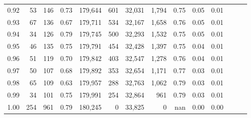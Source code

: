 \begin{tabular}{rrrrrrrrrrrrrr}
0.92 &     53 &  146 &  0.73 &  179,644 &      601 &  32,031 &   1,794 &  0.75 &  0.05 &      0.01 \\
0.93 &     67 &  136 &  0.67 &  179,711 &      534 &  32,167 &   1,658 &  0.76 &  0.05 &      0.01 \\
0.94 &     34 &  126 &  0.79 &  179,745 &      500 &  32,293 &   1,532 &  0.75 &  0.05 &      0.01 \\
0.95 &     46 &  135 &  0.75 &  179,791 &      454 &  32,428 &   1,397 &  0.75 &  0.04 &      0.01 \\
0.96 &     51 &  119 &  0.70 &  179,842 &      403 &  32,547 &   1,278 &  0.76 &  0.04 &      0.01 \\
0.97 &     50 &  107 &  0.68 &  179,892 &      353 &  32,654 &   1,171 &  0.77 &  0.03 &      0.01 \\
0.98 &     65 &  109 &  0.63 &  179,957 &      288 &  32,763 &   1,062 &  0.79 &  0.03 &      0.01 \\
0.99 &     34 &  101 &  0.75 &  179,991 &      254 &  32,864 &     961 &  0.79 &  0.03 &      0.01 \\
1.00 &    254 &  961 &  0.79 &  180,245 &        0 &  33,825 &       0 &   nan &  0.00 &      0.00 \\
\bottomrule
\end{tabular}
